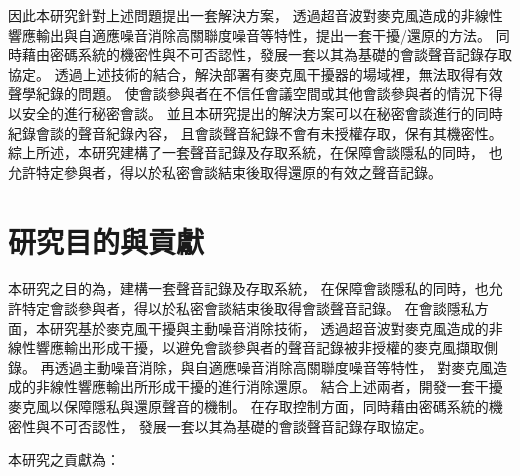     因此本研究針對上述問題提出一套解決方案，
透過超音波對麥克風造成的非線性響應輸出與自適應噪音消除高關聯度噪音等特性，提出一套干擾/還原的方法。
同時藉由密碼系統的機密性與不可否認性，發展一套以其為基礎的會談聲音記錄存取協定。
透過上述技術的結合，解決部署有麥克風干擾器的場域裡，無法取得有效聲學紀錄的問題。
使會談參與者在不信任會議空間或其他會談參與者的情況下得以安全的進行秘密會談。
並且本研究提出的解決方案可以在秘密會談進行的同時紀錄會談的聲音紀錄內容，
且會談聲音紀錄不會有未授權存取，保有其機密性。
綜上所述，本研究建構了一套聲音記錄及存取系統，在保障會談隱私的同時，
也允許特定參與者，得以於私密會談結束後取得還原的有效之聲音記錄。


\section{研究目的與貢獻}\label{section:intro-purpose}

    本研究之目的為，建構一套聲音記錄及存取系統，
在保障會談隱私的同時，也允許特定會談參與者，得以於私密會談結束後取得會談聲音記錄。
在會談隱私方面，本研究基於麥克風干擾與主動噪音消除技術，
透過超音波對麥克風造成的非線性響應輸出形成干擾，以避免會談參與者的聲音記錄被非授權的麥克風擷取側錄。
再透過主動噪音消除，與自適應噪音消除高關聯度噪音等特性，
對麥克風造成的非線性響應輸出所形成干擾的進行消除還原。
結合上述兩者，開發一套干擾麥克風以保障隱私與還原聲音的機制。
在存取控制方面，同時藉由密碼系統的機密性與不可否認性，
發展一套以其為基礎的會談聲音記錄存取協定。

    本研究之貢獻為：

